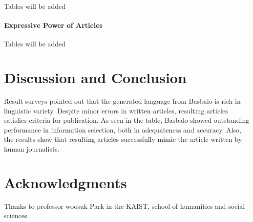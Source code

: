 \documentclass[11pt,letterpaper]{article}
\begin{document}
Tables will be added

\paragraph{Expressive Power of Articles} 

Tables will be added


\section{Discussion and Conclusion}

Result surveys pointed out that the generated language from Basbalo is rich in linguistic variety. Despite minor errors in written articles, resulting articles satisfies criteria for publication. 
As seen in the table, Basbalo showed outstanding performance in information selection, both in adequateness and accuracy. Also, the results show that resulting articles successfully mimic the article written by human journalists. 

\section*{Acknowledgments}

Thanks to professor woosuk Park in the KAIST, school of humanities and social sciences. 



\end{document}
